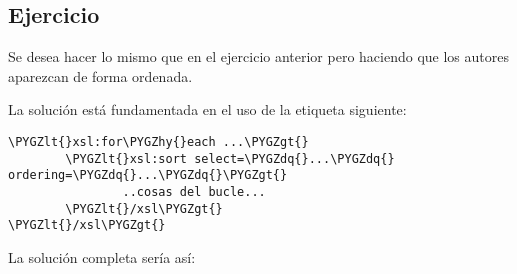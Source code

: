 \documentclass[letterpaper,10pt,spanish]{sphinxmanual}
\def\PYGZlt{\char`\<}
\def\PYGZgt{\char`\>}
\def\PYGZhy{\char`\-}
\def\PYGZdq{\char`\"}
\begin{document}
\subsection{Ejercicio}
\label{tema7:id4}
Se desea hacer lo mismo que en el ejercicio anterior pero haciendo que los autores aparezcan de forma ordenada.

La solución está fundamentada en el uso de la etiqueta siguiente:

\begin{Verbatim}[commandchars=\\\{\}]
\PYGZlt{}xsl:for\PYGZhy{}each ...\PYGZgt{}
        \PYGZlt{}xsl:sort select=\PYGZdq{}...\PYGZdq{} ordering=\PYGZdq{}...\PYGZdq{}\PYGZgt{}
                ..cosas del bucle...
        \PYGZlt{}/xsl\PYGZgt{}
\PYGZlt{}/xsl\PYGZgt{}
\end{Verbatim}

La solución completa sería así:
\end{document}
